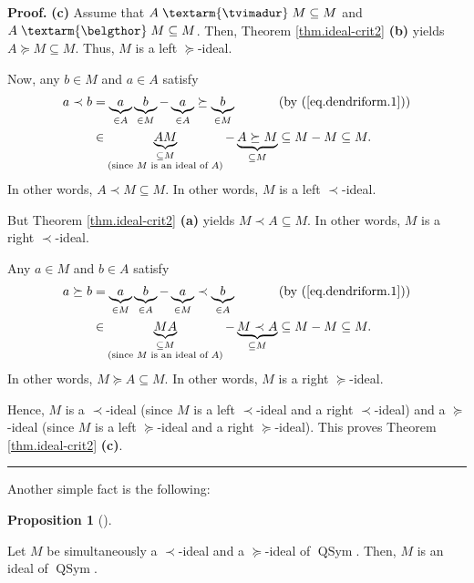 \documentclass[numbers=enddot,12pt,final,onecolumn,notitlepage]{scrartcl}%
\theoremstyle{definition}
\newtheorem{prop}[theo]{Proposition}
\newenvironment{proposition}[1][]
{\begin{prop}[#1]\begin{leftbar}}
{\end{leftbar}\end{prop}}
\newenvironment{proof}[1][Proof]{\noindent\textbf{#1.} }{\ \rule{0.5em}{0.5em}}
\newenvironment{verlong}{}{}
\newcommand{\tvi}{\left. \textarm{\tvimadur} \right.}
\newcommand{\bel}{\left. \textarm{\belgthor} \right.}
\begin{document}
\begin{verlong}
\begin{proof}
\textbf{(c)} Assume that $A\tvi  M\subseteq M$ and $A\bel  M\subseteq M$.
Then, Theorem \ref{thm.ideal-crit2} \textbf{(b)} yields $A\left.
\succeq\right.  M\subseteq M$. Thus, $M$ is a left $\left.  \succeq\right.  $-ideal.

Now, any $b\in M$ and $a\in A$ satisfy%
\begin{align*}
a\left.  \prec\right.  b  &  =\underbrace{a}_{\in A}\underbrace{b}_{\in
M}-\underbrace{a}_{\in A}\left.  \succeq\right.  \underbrace{b}_{\in
M}\ \ \ \ \ \ \ \ \ \ \left(  \text{by (\ref{eq.dendriform.1})}\right) \\
&  \in\underbrace{AM}_{\substack{\subseteq M\\\text{(since }M\text{ is an
ideal of }A\text{)}}}-\underbrace{A\left.  \succeq\right.  M}_{\subseteq
M}\subseteq M-M\subseteq M.
\end{align*}
In other words, $A\left.  \prec\right.  M\subseteq M$. In other words, $M$ is
a left $\left.  \prec\right.  $-ideal.

But Theorem \ref{thm.ideal-crit2} \textbf{(a)} yields $M\left.  \prec\right.
A\subseteq M$. In other words, $M$ is a right $\left.  \prec\right.  $-ideal.

Any $a\in M$ and $b\in A$ satisfy%
\begin{align*}
a\left.  \succeq\right.  b  &  =\underbrace{a}_{\in M}\underbrace{b}_{\in
A}-\underbrace{a}_{\in M}\left.  \prec\right.  \underbrace{b}_{\in
A}\ \ \ \ \ \ \ \ \ \ \left(  \text{by (\ref{eq.dendriform.1})}\right) \\
&  \in\underbrace{MA}_{\substack{\subseteq M\\\text{(since }M\text{ is an
ideal of }A\text{)}}}-\underbrace{M\left.  \prec\right.  A}_{\subseteq
M}\subseteq M-M\subseteq M.
\end{align*}
In other words, $M\left.  \succeq\right.  A\subseteq M$. In other words, $M$
is a right $\left.  \succeq\right.  $-ideal.

Hence, $M$ is a $\left.  \prec\right.  $-ideal (since $M$ is a left $\left.
\prec\right.  $-ideal and a right $\left.  \prec\right.  $-ideal) and a
$\left.  \succeq\right.  $-ideal (since $M$ is a left $\left.  \succeq\right.
$-ideal and a right $\left.  \succeq\right.  $-ideal). This proves Theorem
\ref{thm.ideal-crit2} \textbf{(c)}.
\end{proof}

Another simple fact is the following:

\begin{proposition}
\label{prop.ideal-crit3}Let $M$ be simultaneously a $\left.  \prec\right.
$-ideal and a $\left.  \succeq\right.  $-ideal of $\operatorname*{QSym}$.
Then, $M$ is an ideal of $\operatorname*{QSym}$.
\end{proposition}


\end{verlong}
\end{document}

